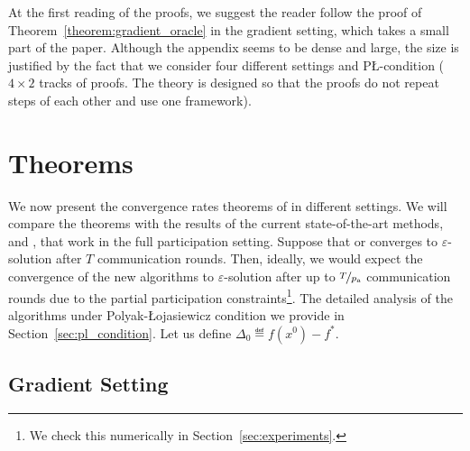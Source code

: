 \documentclass{article}
\newcommand{\alexander}[1]{\todo[inline]{\textbf{Alexander: }#1}}
\newcommand{\algorithmname}{DASHA-PP}
\newcommand*{\probavailable}{\ensuremath{p_{\textnormal{a}}}}
\newcommand*{\probpage}{\ensuremath{p_{\text{page}}}}
\begin{document}

At the first reading of the proofs, we suggest the reader follow the proof of Theorem~\ref{theorem:gradient_oracle} in the gradient setting, which takes a small part of the paper. Although the appendix seems to be dense and large, the size is justified by the fact that we consider four different settings and P\L-condition ($4 \times 2$ tracks of proofs. The theory is designed so that the proofs do not repeat steps of each other and use one framework).



\section{Theorems}

\label{sec:theorems}

We now present the convergence rates theorems of \algname{\algorithmname} in different settings. We will compare the theorems with the results of the current state-of-the-art methods,  and , that work in the full participation setting. Suppose that  or  converges to $\varepsilon$-solution after $T$ communication rounds. Then, ideally, we would expect the convergence of the new algorithms to $\varepsilon$-solution after up to $\nicefrac{T}{\probavailable}$ communication rounds due to the partial participation constraints\footnote{We check this numerically in Section~\ref{sec:experiments}.}. The detailed analysis of the algorithms under Polyak-\L ojasiewicz condition we provide in Section~\ref{sec:pl_condition}. Let us define $\Delta_0 \eqdef f(x^0) - f^*.$

\subsection{Gradient Setting}
\end{document}
